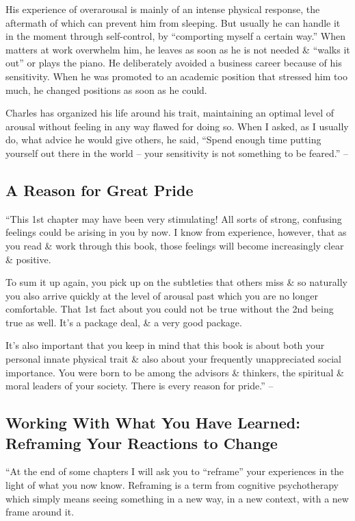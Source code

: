 \documentclass{article}
\numberwithin{equation}{section}
\begin{document}
His experience of overarousal is mainly of an intense physical response, the aftermath of which can prevent him from sleeping. But usually he can handle it in the moment through self-control, by ``comporting myself a certain way.'' When matters at work overwhelm him, he leaves as soon as he is not needed \& ``walks it out'' or plays the piano. He deliberately avoided a business career because of his sensitivity. When he was promoted to an academic position that stressed him too much, he changed positions as soon as he could.

Charles has organized his life around his trait, maintaining an optimal level of arousal without feeling in any way flawed for doing so. When I asked, as I usually do, what advice he would give others, he said, ``Spend enough time putting yourself out there in the world -- your sensitivity is not something to be feared.'' -- \cite[pp. 52--54]{Aron2013}

\subsection{A Reason for Great Pride}
``This 1st chapter may have been very stimulating! All sorts of strong, confusing feelings could be arising in you by now. I know from experience, however, that as you read \& work through this book, those feelings will become increasingly clear \& positive.

To sum it up again, you pick up on the subtleties that others miss \& so naturally you also arrive quickly at the level of arousal past which you are no longer comfortable. That 1st fact about you could not be true without the 2nd being true as well. It's a package deal, \& a very good package.

It's also important that you keep in mind that this book is about both your personal innate physical trait \& also about your frequently unappreciated social importance. You were born to be among the advisors \& thinkers, the spiritual \& moral leaders of your society. There is every reason for pride.'' -- \cite[p. 54]{Aron2013}

\subsection{Working With What You Have Learned: Reframing Your Reactions to Change}
``At the end of some chapters I will ask you to ``reframe'' your experiences in the light of what you now know. Reframing is a term from cognitive psychotherapy which simply means seeing something in a new way, in a new context, with a new frame around it.
\end{document}
